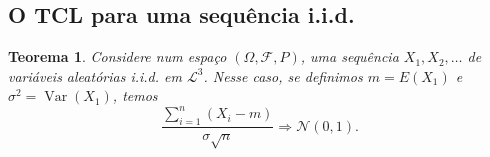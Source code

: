 \documentclass[reqno]{article}
\newcommand*\1{\mathds{1}}
\newtheorem{theorem}{Teorema}[section]
\DeclareMathOperator{\Var}{Var}
\begin{document}
\newpage

\subsection{O TCL para uma sequência i.i.d.}

\begin{theorem}
  \label{:tcl_iid}
  Considere num espaço $(\Omega, \mathcal{F}, P)$, uma sequência $X_1, X_2, \dots$ de variáveis aleatórias i.i.d. em $\mathcal{L}^3$.
  Nesse caso, se definimos $m = E(X_1)$ e $\sigma^2 = \Var(X_1)$, temos
  \begin{equation}
    \frac{\sum_{i=1}^n (X_i - m)}{\sigma \sqrt{n}} \Rightarrow \mathcal{N}(0,1).
  \end{equation}
\end{theorem}
\end{document}
